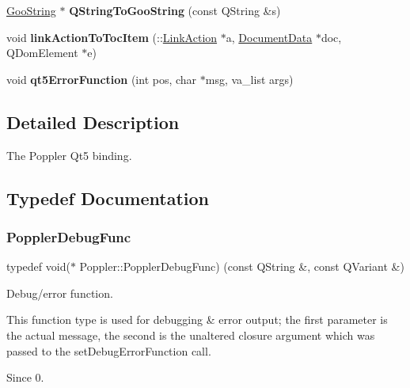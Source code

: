 \begin{DoxyCompactItemize}
\item 
\mbox{\label{namespace_poppler_a233dc72759de08b4dd60e8db51c0decb}} 
\hyperlink{class_goo_string}{Goo\+String} $\ast$ {\bfseries Q\+String\+To\+Goo\+String} (const Q\+String \&s)
\item 
\mbox{\label{namespace_poppler_a3cd0de0ebb0bf81ff258cc22c5806508}} 
void {\bfseries link\+Action\+To\+Toc\+Item} (\+::\hyperlink{class_poppler_1_1_link_action}{Link\+Action} $\ast$a, \hyperlink{class_poppler_1_1_document_data}{Document\+Data} $\ast$doc, Q\+Dom\+Element $\ast$e)
\item 
\mbox{\label{namespace_poppler_a852b2de828552272eb11dd602489034e}} 
void {\bfseries qt5\+Error\+Function} (int pos, char $\ast$msg, va\+\_\+list args)
\end{DoxyCompactItemize}


\subsection{Detailed Description}
The Poppler Qt5 binding. 

\subsection{Typedef Documentation}
\mbox{\label{namespace_poppler_a6743a660a5959ea508737ff913e3bd56}} 
\subsubsection{\texorpdfstring{Poppler\+Debug\+Func}{PopplerDebugFunc}}
{\footnotesize\ttfamily typedef void($\ast$ Poppler\+::\+Poppler\+Debug\+Func) (const Q\+String \&, const Q\+Variant \&)}

Debug/error function.

This function type is used for debugging \& error output; the first parameter is the actual message, the second is the unaltered closure argument which was passed to the set\+Debug\+Error\+Function call.

\begin{DoxySince}{Since}
0. 
\end{DoxySince}


